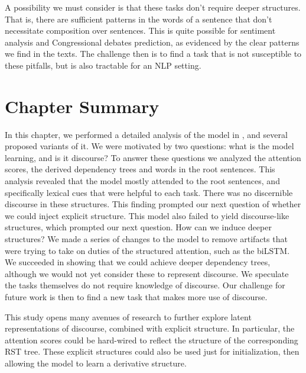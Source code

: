 A possibility we must consider is that these tasks don't require deeper structures. That is, there are sufficient patterns in the words of a sentence that don't necessitate composition over sentences. This is quite possible for sentiment analysis and Congressional debates prediction, as evidenced by the clear patterns we find in the texts. The challenge then is to find a task that is not susceptible to these pitfalls, but is also tractable for an NLP setting.

\section{Chapter Summary}

In this chapter, we performed a detailed analysis of the model in , and several proposed variants of it. We were motivated by two questions: what is the model learning, and is it discourse? To answer these questions we analyzed the attention scores, the derived dependency trees and words in the root sentences. This analysis revealed that the model mostly attended to the root sentences, and specifically lexical cues that were helpful to each task. There was no discernible discourse in these structures. This finding prompted our next question of whether we could inject explicit structure. This model also failed to yield discourse-like structures, which prompted our next question. How can we induce deeper structures? We made a series of changes to the model to remove artifacts that were trying to take on duties of the structured attention, such as the biLSTM. We succeeded in showing that we could achieve deeper dependency trees, although we would not yet consider these to represent discourse. We speculate the tasks themselves do not require knowledge of discourse. Our challenge for future work is then to find a new task that makes more use of discourse. 

This study opens many avenues of research to further explore latent representations of discourse, combined with explicit structure. In particular, the attention scores could be hard-wired to reflect the structure of the corresponding RST tree. These explicit structures could also be used just for initialization, then allowing the model to learn a derivative structure.
